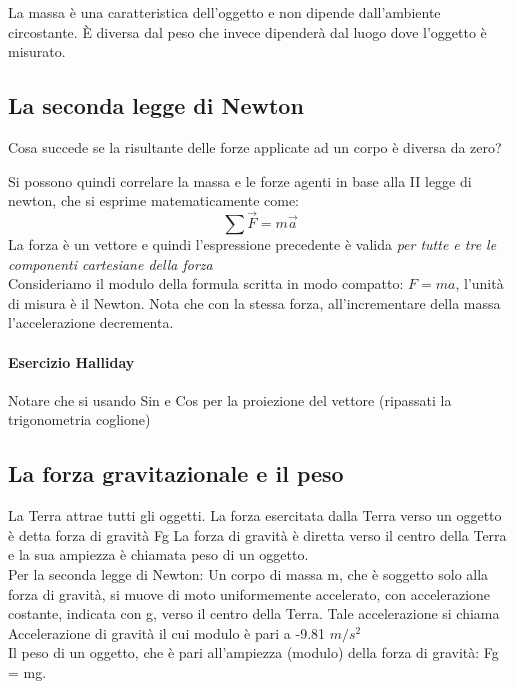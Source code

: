 \documentclass[12pt, a4paper, openany]{book}
\begin{document}
La massa è una caratteristica dell'oggetto e non dipende dall'ambiente circostante.
È diversa dal peso che invece dipenderà dal luogo dove l'oggetto è misurato.

\subsection*{La seconda legge di Newton}
Cosa succede se la risultante delle forze applicate ad un corpo è diversa da zero?

Si possono quindi correlare la massa e le forze agenti in base alla II legge di newton, che si esprime matematicamente come:
\[\sum \overrightarrow{F} = m\overrightarrow{a}\]
La forza è un vettore e quindi l'espressione precedente è valida \emph{per tutte e tre le componenti cartesiane della forza}
\\Consideriamo il modulo della formula scritta in modo compatto: $F=ma$, l'unità di misura è il Newton.
Nota che con la stessa forza, all'incrementare della massa l'accelerazione decrementa.

\paragraph*{Esercizio Halliday} Notare che si usando Sin e Cos per la proiezione del vettore (ripassati la trigonometria coglione)

\subsection*{La forza gravitazionale e il peso}
La Terra attrae tutti gli oggetti. La forza esercitata dalla Terra verso un oggetto è detta forza di
gravità Fg
La forza di gravità è diretta verso il centro della Terra e la sua ampiezza è chiamata peso di un
oggetto.
\\Per la seconda legge di Newton: Un corpo di massa m, che è soggetto solo alla forza di gravità, si muove di moto uniformemente
accelerato, con accelerazione costante, indicata con g, verso il centro della Terra.
Tale accelerazione si chiama Accelerazione di gravità il cui modulo è pari a -9.81 $m/s^2$
\\Il peso di un oggetto, che è pari all’ampiezza (modulo) della forza di gravità: Fg = mg.
\end{document}
